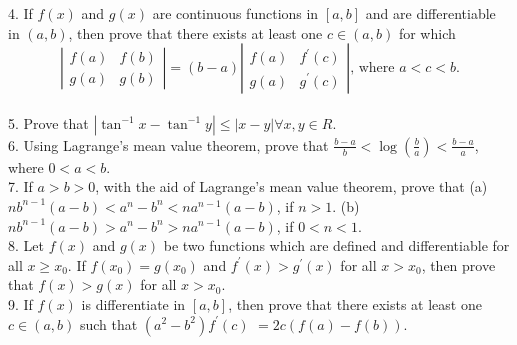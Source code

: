 4. If $f(x)$ and $g(x)$ are continuous functions in $[a, b]$ and are differentiable in $(a, b)$, then prove that there exists at least one $c \in(a, b)$ for which
$$
\left|\begin{array}{ll}
f(a) & f(b) \\
g(a) & g(b)
\end{array}\right|=(b-a)\left|\begin{array}{ll}
f(a) & f^{\prime}(c) \\
g(a) & g^{\prime}(c)
\end{array}\right| \text {, where } a<c<b .
$$\\
5. Prove that $\left|\tan ^{-1} x-\tan ^{-1} y\right| \leq|x-y| \forall x, y \in R$.\\
6. Using Lagrange's mean value theorem, prove that $\frac{b-a}{b}<\log \left(\frac{b}{a}\right)<\frac{b-a}{a}$, where $0<a<b$.\\
7. If $a>b>0$, with the aid of Lagrange's mean value theorem, prove that
(a) $n b^{n-1}(a-b)<a^n-b^n<n a^{n-1}(a-b)$, if $n>1$.
(b) $n b^{n-1}(a-b)>a^n-b^n>n a^{n-1}(a-b)$, if $0<n<1$.\\
8. Let $f(x)$ and $g(x)$ be two functions which are defined and differentiable for all $x \geq x_0$. If $f\left(x_0\right)=g\left(x_0\right)$ and $f^{\prime}(x)>g^{\prime}(x)$ for all $x>x_0$, then prove that $f(x)>g(x)$ for all $x>x_0$.\\
9. If $f(x)$ is differentiate in $[a, b]$, then prove that there exists at least one $c \in(a, b)$ such that $\left(a^2-b^2\right) f^{\prime}(c)$ $=2 c(f(a)-f(b))$.\\

